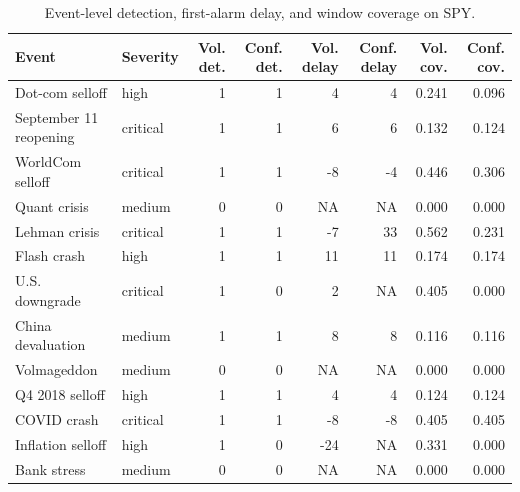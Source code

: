 \documentclass[pdflatex,sn-mathphys-num,iicol]{sn-jnl}
\begin{document}
\begin{table}[t]
\centering
\caption{Event-level detection, first-alarm delay, and window coverage on SPY.}
\label{tab:spy_event_level}
\scriptsize
\begin{tabular}{llrrrrrr}
\toprule
Event & Severity & Vol. det. & Conf. det. & Vol. delay & Conf. delay & Vol. cov. & Conf. cov.\\
\midrule
Dot-com selloff & high & 1 & 1 & 4 & 4 & 0.241 & 0.096\\
September 11 reopening & critical & 1 & 1 & 6 & 6 & 0.132 & 0.124\\
WorldCom selloff & critical & 1 & 1 & -8 & -4 & 0.446 & 0.306\\
Quant crisis & medium & 0 & 0 & NA & NA & 0.000 & 0.000\\
Lehman crisis & critical & 1 & 1 & -7 & 33 & 0.562 & 0.231\\
Flash crash & high & 1 & 1 & 11 & 11 & 0.174 & 0.174\\
U.S. downgrade & critical & 1 & 0 & 2 & NA & 0.405 & 0.000\\
China devaluation & medium & 1 & 1 & 8 & 8 & 0.116 & 0.116\\
Volmageddon & medium & 0 & 0 & NA & NA & 0.000 & 0.000\\
Q4 2018 selloff & high & 1 & 1 & 4 & 4 & 0.124 & 0.124\\
COVID crash & critical & 1 & 1 & -8 & -8 & 0.405 & 0.405\\
Inflation selloff & high & 1 & 0 & -24 & NA & 0.331 & 0.000\\
Bank stress & medium & 0 & 0 & NA & NA & 0.000 & 0.000\\
\bottomrule
\end{tabular}
\end{table}
\end{document}
